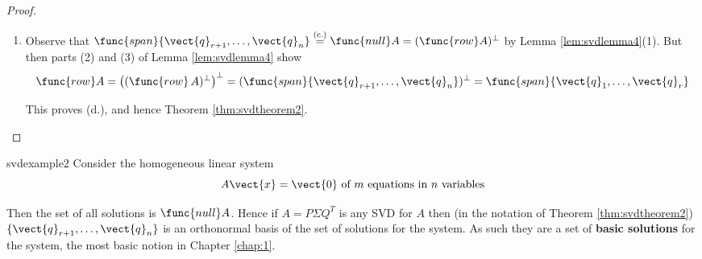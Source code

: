 \begin{proof}
\begin{enumerate}
\begin{enumerate}[label=\alph*.]
\noindent Observe that each $d_{j}$ is an eigenvalue of $\Sigma^{T}\Sigma $ with eigenvector $\vect{e}_{j}=$ column $j$ of $I_{n}$. Thus $\vect{q}_{j}=Q\vect{e}_{j}$ for each $j$. As $A^{T}A=Q\Sigma^{T}\Sigma Q^{T}$ (proof of Lemma \ref{lem:svdlemma3}), we obtain 
\begin{equation*}
(A^{T}A)\vect{v}_{j}=(Q\Sigma^{T}\Sigma Q^{T})(Q\vect{e}_{j})=Q(\Sigma^{T}\Sigma \vect{e}_{j})=Q\left( d_{j}^{2}\vect{e}_{j}\right) =d_{j}^{2}Q\vect{e}_{j}=d_{j}^{2}\vect{q}_{j} 
\end{equation*}

\noindent for $1\leq j\leq n$. Thus each $\vect{q}_{j}$ is an eigenvector
of $A^{T}A$ corresponding to $d_{j}^{2}$. But then
\begin{equation*}
\vectlength A\vect{q}_{j}\vectlength^{2}=(A\vect{q}_{j})^{T}A\vect{q}_{j}=\vect{q}_{j}^{T}(A^{T}A\vect{q}_{j})=\vect{q}_{j}^{T}(d _{j}^{2}\vect{q}_{j})=d_{j}^{2}\vectlength \vect{q}_{j}\vectlength^{2}=d_{j}^{2}\quad \mbox{for } i=1,\ldots ,n
\end{equation*}

\noindent In particular, $A\vect{q}_{j}=\vect{0}$ whenever $j>r$, so $\vect{q}_{j}\in \func{null}A$ if $j>r$, as desired. This proves (c).

\item Observe that $\func{span}\{\vect{q}_{r+1},\ldots ,\vect{q}_{n}\}\overset{\text{(c.)}}{=}\func{null}A=(\func{row}A)^{\perp}$ by
Lemma \ref{lem:svdlemma4}(1). But then parts (2) and (3) of Lemma \ref{lem:svdlemma4} show 
\begin{equation*}
\func{row}A=\left((\func{row}\,A)^{\perp}\right)^{\perp}=(\func{span}\{\vect{q}_{r+1},\ldots ,\vect{q}_{n}\})^{\perp}=\func{span}\{\vect{q}_{1},\ldots ,\vect{q}_{r}\}
\end{equation*}

\noindent This proves (d.), and hence Theorem \ref{thm:svdtheorem2}.
\end{enumerate}
\end{enumerate}
\end{proof}

\begin{example}{}{svdexample2}
Consider the homogeneous linear system 
\begin{equation*}
A\vect{x}=\vect{0} \mbox{ of } m \mbox{ equations in } n \mbox{ variables}
\end{equation*}

\noindent Then the set of all solutions is $\func{null} A$. 
Hence if $A=P\Sigma Q^{T}$ is any SVD for $A$ then (in the notation of Theorem \ref{thm:svdtheorem2}) $\{\vect{q}_{r+1},\ldots ,\vect{q}_{n}\}$ is an orthonormal basis of the set of solutions for the system. As such they are a set of \textbf{basic solutions} for the system, the most basic notion in Chapter \ref{chap:1}.
\end{example}

